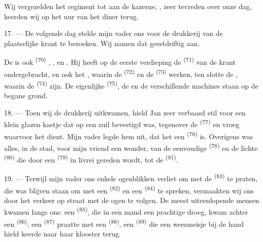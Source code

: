 Wij vergezelden het regiment tot aan de kazerne, , zeer tevreden over onze dag,
keerden wij op het uur van het diner terug.

\VUsaut{3.0mm}

17. --- De volgende dag stelde mijn vader ons voor de drukkerij van de plaatselijke krant te
bezoeken. Wij namen dat geestdriftig aan.

De  is ook  \textsuperscript{(70)}
, ,  en
. Hij heeft op de eerste verdieping de 
\textsuperscript{(71)} van de krant ondergebracht, en ook het
, waarin de  \textsuperscript{(72)} en
de  \textsuperscript{(73)} werken, ten slotte de
, waarin de  \textsuperscript{(74)}
zijn. De eigenlijke  \textsuperscript{(75)}, de
 en de verschillende machines staan op de begane grond.

\VUsaut{3.0mm}

18. --- Toen wij de drukkerij uitkwamen, hield Jan zeer verbaasd stil voor een klein glazen
kastje dat op een zuil bevestigd was, tegenover de
 \textsuperscript{(77)} en vroeg waarvoor het dient. Mijn
vader legde hem uit, dat het een  \textsuperscript{(76)} is. Overigens was
alles, in de stad, voor mijn vriend een wonder, van de eenvoudige
 \textsuperscript{(78)} en de lichte
 \textsuperscript{(80)} die door een
 \textsuperscript{(79)} in livrei gereden wordt, tot de
 \textsuperscript{(81)}.

19. --- Terwijl mijn vader ons enkele ogenblikken verliet om met de
 \textsuperscript{(83)} te praten, die was blijven
staan om met een  \textsuperscript{(82)} en een
 \textsuperscript{(84)} te spreken, vermaakten wij ons door het
verkeer op straat met de ogen te volgen. De meest uiteenlopende mensen kwamen langs ons: een
 \textsuperscript{(85)}, die in een mand een prachtige
 droeg, kwam achter een
 \textsuperscript{(86)}; een 
\textsuperscript{(87)} praatte met een  \textsuperscript{(88)}, een
 \textsuperscript{(89)} die een weesmeisje bij de hand hield keerde naar haar
klooster terug.

